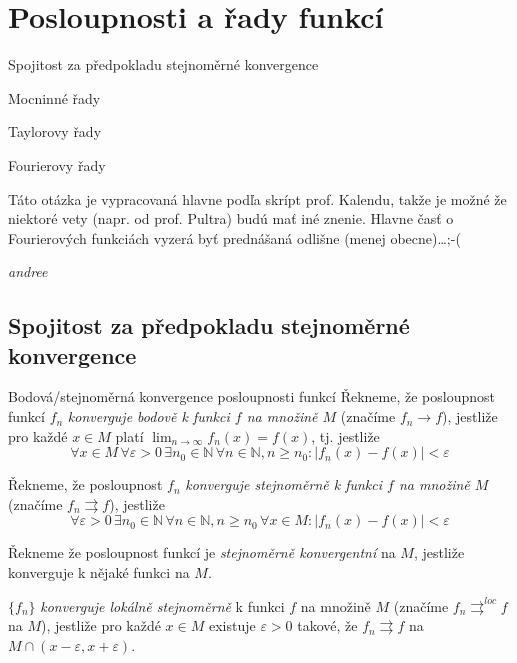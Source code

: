 \section{Posloupnosti a řady funkcí}

\begin{pozadavky}
\begin{pitemize}
	\item Spojitost za předpokladu stejnoměrné konvergence
	\item Mocninné řady
	\item Taylorovy řady
	\item Fourierovy řady
\end{pitemize}
\end{pozadavky}

Táto otázka je vypracovaná hlavne podľa skrípt prof. Kalendu, takže je možné že niektoré vety (napr. od prof. Pultra) budú mať iné znenie. Hlavne časť o Fourierových funkciách vyzerá byť prednášaná odlišne (menej obecne)\dots ;-(
\begin{flushright}
\textit{andree}
\end{flushright}

\subsection{Spojitost za předpokladu stejnoměrné konvergence}

\begin{definiceN}{Bodová/stejnoměrná konvergence posloupnosti funkcí}
Řekneme, že posloupnost funkcí $f_n$ \emph{konverguje bodově k funkci $f$ na množině $M$} (značíme $f_n \rightarrow f$), jestliže pro každé  $x \in M$ platí $\lim_{n \rightarrow \infty} f_n(x) = f(x)$, tj. jestliže
$$\forall x \in M\, \forall \varepsilon > 0\, \exists n_0 \in \mathbb{N}\, \forall n \in \mathbb{N}, n \ge n_0: |f_n(x)-f(x)| < \varepsilon$$

Řekneme, že posloupnost $f_n$ \emph{konverguje stejnoměrně k funkci $f$ na množině $M$} (značíme $f_n \rightrightarrows f$), jestliže
$$\forall \varepsilon > 0\, \exists n_0 \in \mathbb{N}\, \forall n \in \mathbb{N}, n \ge n_0\, \forall x \in M: |f_n(x)-f(x)| < \varepsilon$$

Řekneme že posloupnost funkcí je \emph{stejnoměrně konvergentní} na $M$, jestliže konverguje k nějaké funkci na $M$.
\end{definiceN}

\begin{definice}
$\{f_n\}$ \emph{konverguje lokálně stejnoměrně} k funkci $f$ na množině $M$ (značíme $f_n \rightrightarrows^{loc} f$ na $M$), jestliže pro každé $x \in M$ existuje $\varepsilon > 0$ takové, že $f_n \rightrightarrows f$ na $M \cap (x-\varepsilon, x+\varepsilon)$. 
\end{definice}

